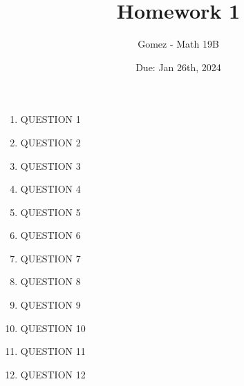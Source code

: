 \documentclass[11pt]{article}
\title{Homework 1}
\author{Gomez - Math 19B}
\date{Due: Jan 26th, 2024}
\begin{document}
\maketitle

\noindent 
\normalsize
\begin{enumerate}

\item 
QUESTION 1
\item 
QUESTION 2
\item 
QUESTION 3
\item 
QUESTION 4
\item 
QUESTION 5
\item 
QUESTION 6
\item 
QUESTION 7
\item 
QUESTION 8
\item 
QUESTION 9
\item 
QUESTION 10
\item 
QUESTION 11
\item 
QUESTION 12

\end{enumerate}
%

%
\end{document}
